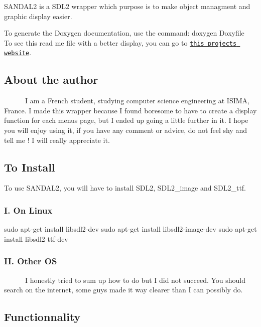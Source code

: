 S\+A\+N\+D\+A\+L2 is a S\+D\+L2 wrapper which purpose is to make object managment and graphic display easier.

To generate the Doxygen documentation, use the command\+: {\ttfamily doxygen Doxyfile} ~\newline
 To see this read me file with a better display, you can go to \href{https://klevh.github.io/SANDAL2/}{\tt this project\textquotesingle{}s website}. \subsection*{About the author}

~~~~~~I am a French student, studying computer science engineering at I\+S\+I\+MA, France. I made this wrapper because I found boresome to have to create a display function for each menu\textquotesingle{}s page, but I ended up going a little further in it. I hope you will enjoy using it, if you have any comment or advice, do not feel shy and tell me ! I will really appreciate it.

\subsection*{To Install}

To use S\+A\+N\+D\+A\+L2, you will have to install S\+D\+L2, S\+D\+L2\+\_\+image and S\+D\+L2\+\_\+ttf.

\subsubsection*{I. On Linux}

\textquotesingle{}\textquotesingle{}\textquotesingle{} sudo apt-\/get install libsdl2-\/dev sudo apt-\/get install libsdl2-\/image-\/dev sudo apt-\/get install libsdl2-\/ttf-\/dev \textquotesingle{}\textquotesingle{}\textquotesingle{}

\subsubsection*{II. Other OS}

~~~~~~I honestly tried to sum up how to do but I did not succeed. You should search on the internet, some guys made it way clearer than I can possibly do.

\subsection*{Functionnality}

